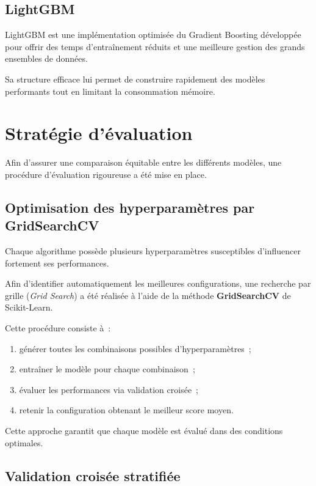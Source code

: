 \subsection{LightGBM}

LightGBM est une implémentation optimisée du Gradient Boosting développée pour offrir des
temps d'entraînement réduits et une meilleure gestion des grands ensembles de données.

Sa structure efficace lui permet de construire rapidement des modèles performants tout en
limitant la consommation mémoire.

\section{Stratégie d'évaluation}

Afin d'assurer une comparaison équitable entre les différents modèles, une procédure
d'évaluation rigoureuse a été mise en place.

\subsection{Optimisation des hyperparamètres par GridSearchCV}

Chaque algorithme possède plusieurs hyperparamètres susceptibles d'influencer fortement ses
performances.

Afin d'identifier automatiquement les meilleures configurations, une recherche par grille
(\emph{Grid Search}) a été réalisée à l'aide de la méthode \textbf{GridSearchCV} de
Scikit-Learn.

Cette procédure consiste à~:
\begin{enumerate}[leftmargin=1.4em,itemsep=2pt]
  \item générer toutes les combinaisons possibles d'hyperparamètres~;
  \item entraîner le modèle pour chaque combinaison~;
  \item évaluer les performances via validation croisée~;
  \item retenir la configuration obtenant le meilleur score moyen.
\end{enumerate}

Cette approche garantit que chaque modèle est évalué dans des conditions optimales.

\subsection{Validation croisée stratifiée}

